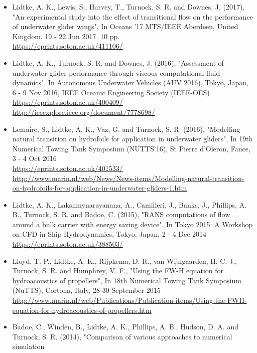 \documentclass[a4paper,10pt]{article}
\begin{document}
\begin{itemize}
%
\item Lidtke, A. K., Lewis, S., Harvey, T., Turnock, S. R. and Downes, J. (2017),
	"An experimental study into the effect of transitional flow on the performance
	of underwater glider wings", In Oceans '17 MTS/IEEE Aberdeen, United Kingdom.
	19 - 22 Jun 2017. 10 pp.
	\cite{Lidtke2017b}
	\\ \url{https://eprints.soton.ac.uk/411106/}
%
\item Lidtke, A. K., Turnock, S. R. and Downes, J. (2016), "Assessment of underwater
	glider performance through viscous computational fluid dynamics", In Autonomous
	Underwater Vehicles (AUV 2016), Tokyo, Japan, 6 - 9 Nov 2016, IEEE Oceanic Engineering Society (IEEE-OES)
	\cite{Lidtke2016d}
	\\ \url{https://eprints.soton.ac.uk/400409/}
	\\ \url{http://ieeexplore.ieee.org/document/7778698/}
%
\item Lemaire, S., Lidtke, A. K., Vaz, G. and Turnock, S. R. (2016), "Modelling
	natural transition on hydrofoils for application in underwater gliders",
	In 19th Numerical Towing Tank Symposium (NUTTS'16), St Pierre d'Oleron, Fance, 3 - 4 Oct 2016
	\cite{Lemaire2016}
	\\ \url{https://eprints.soton.ac.uk/401533/}
	\\ \url{http://www.marin.nl/web/News/News-items/Modelling-natural-transition-on-hydrofoils-for-application-in-underwater-gliders-1.htm}
%
\item Lidtke, A. K., Lakshmynarayanana, A., Camilleri, J., Banks, J., Phillips, A. B.,
	Turnock, S. R. and Badoe, C. (2015), "RANS computations of flow around a bulk
	carrier with energy saving device", In Tokyo 2015: A Workshop on CFD in Ship
	Hydrodynamics, Tokyo, Japan, 2 - 4 Dec 2014
	\cite{Lidtke2015b}
	\\ \url{https://eprints.soton.ac.uk/388503/}
%
\item Lloyd, T. P., Lidtke, A. K., Rijpkema, D. R., van Wijngaarden, H. C. J.,
	Turnock, S. R. and Humphrey, V. F., "Using the FW-H equation for hydroacoustics
	of propellers", In 18th Numerical Towing Tank Symposium (NuTTS), Cortona, Italy, 28-30 September 2015
	\cite{Lloyd2015a}
	\\ \url{http://www.marin.nl/web/Publications/Publication-items/Using-the-FWH-equation-for-hydroacoustics-of-propellers.htm}
%
\item Badoe, C., Winden, B., Lidtke, A. K., Phillips, A. B., Hudson, D. A. and
	Turnock, S. R. (2014), "Comparison of various approaches to numerical simulation

\end{itemize}
\end{document}
